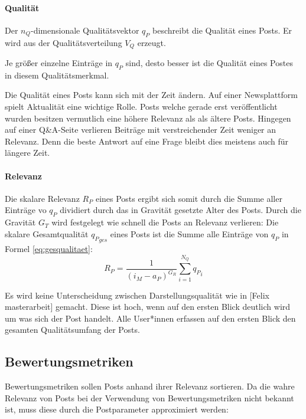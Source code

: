 \paragraph{Qualität}
\label{pqualitaet}

Der $n_Q$-dimensionale Qualitätsvektor $q_P$ beschreibt die Qualität eines Posts. Er wird aus der Qualitätsverteilung $V_Q$ erzeugt. 

Je größer einzelne Einträge in $q_P$ sind, desto besser ist die Qualität eines Postes in diesem Qualitätsmerkmal.

Die Qualität eines Posts kann sich mit der Zeit ändern. Auf einer Newsplattform spielt Aktualität eine wichtige Rolle. Posts welche gerade erst veröffentlicht wurden besitzen vermutlich eine höhere Relevanz als als ältere Posts. Hingegen auf einer Q\&A-Seite verlieren Beiträge mit verstreichender Zeit weniger an Relevanz. Denn die beste Antwort auf eine Frage bleibt dies meistens auch für längere Zeit.

\paragraph{Relevanz}

Die skalare Relevanz $R_P$ eines Posts ergibt sich somit durch die Summe aller Einträge vo $q_P$ dividiert durch das in Gravität gesetzte Alter des Posts. Durch die Gravität $G_T$ wird festgelegt wie schnell die Posts an Relevanz verlieren:
Die skalare Gesamtqualität ${q_P}_{ges}$ eines Posts ist die Summe alle Einträge von $q_P$ in Formel \ref{eq:gesqualitaet}:
\begin{equation}
\label{eq:gesqualitaet}
{R_P} = \frac{1}{(i_M - a_P)^{G_R}}\sum_{i=1}^{N_Q} {q_P}_i
\end{equation}

Es wird keine Unterscheidung zwischen Darstellungsqualität wie in [Felix masterarbeit] gemacht. Diese ist hoch, wenn auf den ersten Blick deutlich wird um was sich der Post handelt. Alle User*innen erfassen auf den ersten Blick den gesamten Qualitätsumfang der Posts.

\subsection{Bewertungsmetriken}
\label{sec:bewertungsmetrik}

Bewertungsmetriken sollen Posts anhand ihrer Relevanz sortieren. Da die wahre Relevanz von Posts bei der Verwendung von Bewertungsmetriken nicht bekannt ist, muss diese durch die Postparameter approximiert werden: 

